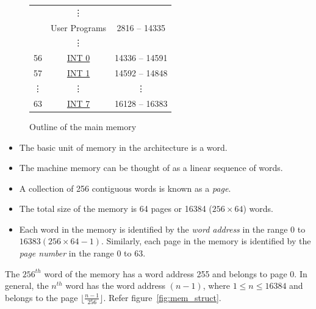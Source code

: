 {\begin{figure}[htp!]
\begin{tabular}{|c|c|c|}
				&  \vdots & \\   
				&  User Programs & 2816 -- 14335 \\  
				& \vdots & \\ \hline 
			56 & \hyperref[lbl:int]{INT 0} & 14336 -- 14591 \\ \hline 
			57 & \hyperref[lbl:int]{INT 1} & 14592 -- 14848 \\ \hline 
			\vdots & \vdots & \vdots \\ \hline 
			63 & \hyperref[lbl:int]{INT 7} & 16128 -- 16383 \\  
			\bottomrule
		\end{tabular}
		\caption{Outline of the main memory}
		\label{#1}
	\end{figure}

}


\begin{itemize}
	\item The basic unit of memory in the \ESIM architecture is a word. 
	\item The machine memory can be thought of as a linear sequence of words.
	\item A collection of 256 contiguous words is known as a \emph{page}. 
	\item The total size of the memory is 64 pages or 16384 ($256 \times 64$) words.
	\item Each word in the memory is identified by the \emph{word address} in the range 0 to $16383(256 \times 64 - 1)$. Similarly, each page in the memory is identified by the \emph{page number}  in the range 0 to 63.
\end{itemize}

\begin{example}
	The $256^{th}$ word of the memory has a word address 255 and belongs to page 0. In general, the $n^{th}$ word has the word address $(n-1)$, where  $1 \le n \le 16384$ and belongs to the page $\lfloor \frac{n-1}{256} \rfloor$. Refer figure~\ref{fig:mem_struct}. 
\end{example}


